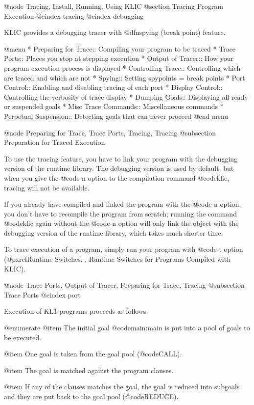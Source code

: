 {{{{@node Tracing, Install, Running, Using KLIC
@section Tracing Program Execution
@cindex tracing
@cindex debugging

KLIC provides a debugging tracer with @dfn{spying} (break point)
feature.

@menu
* Preparing for Trace::         Compiling your program to be traced
* Trace Ports::                 Places you stop at stepping execution
* Output of Tracer::            How your program execution process is displayed
* Controlling Trace::           Controlling which are traced and which are not
* Spying::                      Setting spypoints = break points
* Port Control::                Enabling and disabling tracing of each port
* Display Control::             Controlling the verbosity of trace display
* Dumping Goals::               Displaying all ready or suspended goals
* Misc Trace Commands::         Miscellaneous commands
* Perpetual Suspension::        Detecting goals that can never proceed
@end menu

@node Preparing for Trace, Trace Ports, Tracing, Tracing
@subsection Preparation for Traced Execution

To use the tracing feature, you have to link your program with the
debugging version of the runtime library.  The debugging version is used
by default, but when you give the @code{-n} option to the compilation
command @code{klic}, tracing will not be available.

If you already have compiled and linked the program with the @code{-n}
option, you don't have to recompile the program from scratch; running
the command @code{klic} again without the @code{-n} option will only
link the object with the debugging version of the runtime library, which
takes much shorter time.

To trace execution of a program, simply run your program with @code{-t}
option (@pxref{Runtime Switches, , Runtime Switches for Programs
Compiled with KLIC}).

@node Trace Ports, Output of Tracer, Preparing for Trace, Tracing
@subsection Trace Ports
@cindex port

Execution of KL1 programs proceeds as follows.

@enumerate
@item
The initial goal @code{main:main} is put into a pool of goals to be
executed.

@item
One goal is taken from the goal pool (@code{CALL}).

@item
The goal is matched against the program clauses.

@item
If any of the clauses matches the goal, the goal is reduced into
subgoals and they are put back to the goal pool (@code{REDUCE}).

}}}}
